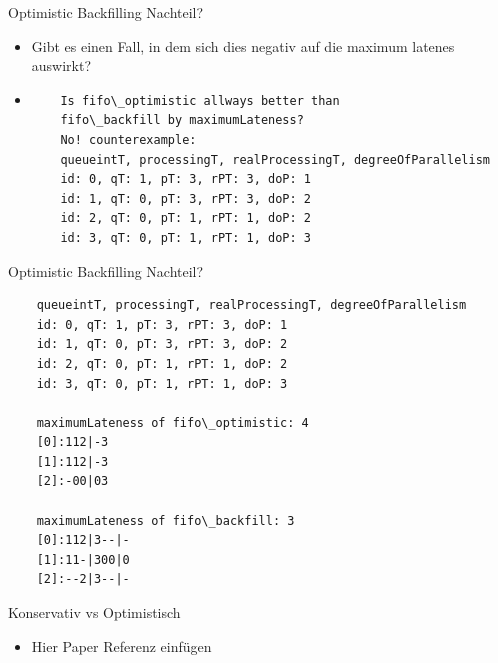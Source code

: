 \documentclass[aspectratio=169,10pt]{beamer}
\begin{document}
\begin{frame}[t,fragile]{Optimistic Backfilling Nachteil?}
\begin{itemize}[<+->]
	\item Gibt es einen Fall, in dem sich dies negativ auf die maximum latenes auswirkt?
	\item \begin{verbatim}
	Is fifo\_optimistic allways better than
	fifo\_backfill by maximumLateness?
	No! counterexample:
	queueintT, processingT, realProcessingT, degreeOfParallelism
	id: 0, qT: 1, pT: 3, rPT: 3, doP: 1
	id: 1, qT: 0, pT: 3, rPT: 3, doP: 2
	id: 2, qT: 0, pT: 1, rPT: 1, doP: 2
	id: 3, qT: 0, pT: 1, rPT: 1, doP: 3
	\end{verbatim}
\end{itemize}
\end{frame}

\begin{frame}[t,fragile]{Optimistic Backfilling Nachteil?}
\small
\begin{verbatim}	
	queueintT, processingT, realProcessingT, degreeOfParallelism
	id: 0, qT: 1, pT: 3, rPT: 3, doP: 1
	id: 1, qT: 0, pT: 3, rPT: 3, doP: 2
	id: 2, qT: 0, pT: 1, rPT: 1, doP: 2
	id: 3, qT: 0, pT: 1, rPT: 1, doP: 3

	maximumLateness of fifo\_optimistic: 4
	[0]:112|-3
	[1]:112|-3
	[2]:-00|03
	
	maximumLateness of fifo\_backfill: 3
	[0]:112|3--|-
	[1]:11-|300|0
	[2]:--2|3--|-
\end{verbatim}
\end{frame}

\begin{frame}[t, fragile]{Konservativ vs Optimistisch}
	\begin{itemize}
		\item Hier Paper Referenz einfügen
	\end{itemize}
\end{frame}
\end{document}
